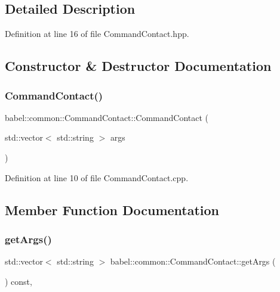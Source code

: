 \subsection{Detailed Description}


Definition at line 16 of file Command\+Contact.\+hpp.



\subsection{Constructor \& Destructor Documentation}
\mbox{\label{classbabel_1_1common_1_1_command_contact_ae66f5c49e02e93bd2d8683fc35aad63d}} 
\subsubsection{\texorpdfstring{Command\+Contact()}{CommandContact()}}
{\footnotesize\ttfamily babel\+::common\+::\+Command\+Contact\+::\+Command\+Contact (\begin{DoxyParamCaption}\item[{std\+::vector$<$ std\+::string $>$}]{args }\end{DoxyParamCaption})}



Definition at line 10 of file Command\+Contact.\+cpp.



\subsection{Member Function Documentation}
\mbox{\label{classbabel_1_1common_1_1_command_contact_a660c56eaf8a3ec532ba18e11292554df}} 
\subsubsection{\texorpdfstring{get\+Args()}{getArgs()}}
{\footnotesize\ttfamily std\+::vector$<$ std\+::string $>$ babel\+::common\+::\+Command\+Contact\+::get\+Args (\begin{DoxyParamCaption}{ }\end{DoxyParamCaption}) const\hspace{0.3cm}{\ttfamily [override]}, {\ttfamily [virtual]}}



